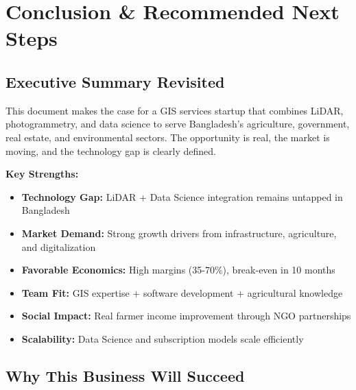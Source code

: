 
\chapter{Conclusion \& Recommended Next Steps}

\section{Executive Summary Revisited}

This document makes the case for a GIS services startup that combines LiDAR, photogrammetry, and data science to serve Bangladesh's agriculture, government, real estate, and environmental sectors. The opportunity is real, the market is moving, and the technology gap is clearly defined.

\textbf{Key Strengths:}
\begin{itemize}
    \item \textcolor{AccentGreen}{\textbf{Technology Gap:}} LiDAR + Data Science integration remains untapped in Bangladesh
    \item \textcolor{AccentGreen}{\textbf{Market Demand:}} Strong growth drivers from infrastructure, agriculture, and digitalization
    \item \textcolor{AccentGreen}{\textbf{Favorable Economics:}} High margins (35-70\%), break-even in 10 months
    \item \textcolor{AccentGreen}{\textbf{Team Fit:}} GIS expertise + software development + agricultural knowledge
    \item \textcolor{AccentGreen}{\textbf{Social Impact:}} Real farmer income improvement through NGO partnerships
    \item \textcolor{AccentGreen}{\textbf{Scalability:}} Data Science and subscription models scale efficiently
\end{itemize}

\section{Why This Business Will Succeed}

